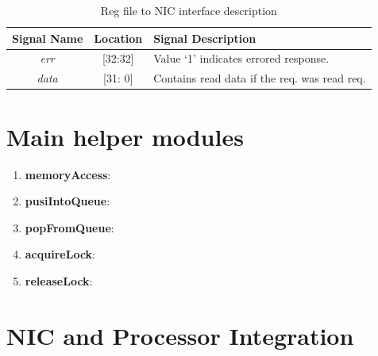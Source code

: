 \documentclass[a4paper,11pt, final]{report}
\begin{document}
				\begin{table}[!htbp]
					\centering
					\begin{tabular}{ccl}
						\hline
						\textbf{Signal Name} 		& \textbf{Location} 		&\textbf{Signal Description}  \\ \hline
						\textit{err}			& [32:32]			& Value `1' indicates errored response.\\\hline
						\textit{data}   		& [31: 0] 			& Contains read data if the req. was read req.\\ \hline
					\end{tabular}
					\caption{ Reg file to NIC interface description}
					\label{tab:Reg-NIC-interface-resp}
				\end{table}


		\section{Main helper modules}
			\begin{enumerate}
				\item \textbf{memoryAccess}: \\
				\item \textbf{pusiIntoQueue}: \\
				\item \textbf{popFromQueue}: \\
				\item \textbf{acquireLock}: \\
				\item \textbf{releaseLock}: \\
			\end{enumerate}	
	\section{NIC and Processor Integration}
	
\end{document}

